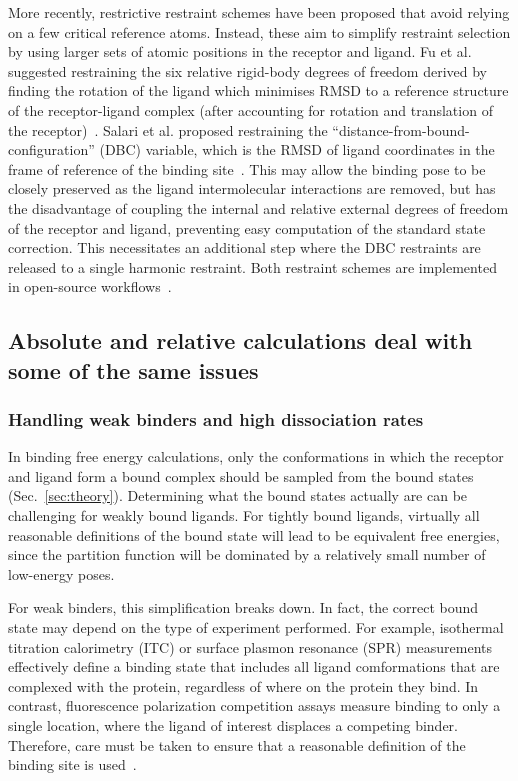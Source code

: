 \documentclass[9pt,bestpractices,pubversion]{livecoms}
\begin{document}
More recently, restrictive restraint schemes have been proposed that avoid relying on a few critical reference atoms. Instead, these aim to simplify restraint selection by using larger sets of atomic positions in the receptor and ligand. Fu et al. suggested restraining the six relative rigid-body degrees of freedom derived by finding the rotation of the ligand which minimises RMSD to a reference structure of the receptor-ligand complex (after accounting for rotation and translation of the receptor)~\cite{fu2017new}. Salari et al. proposed restraining the ``distance-from-bound-configuration'' (DBC) variable, which is the RMSD of ligand coordinates in the frame of reference of the binding site~\cite{salari2018streamlined, ebrahimi2022symmetry}. This may allow the binding pose to be closely preserved as the ligand intermolecular interactions are removed, but has the disadvantage of coupling the internal and relative external degrees of freedom of the receptor and ligand, preventing easy computation of the standard state correction. This necessitates an additional step where the DBC restraints are released to a single harmonic restraint. Both restraint schemes are implemented in open-source workflows~\cite{fu2021bfee2, fu2022accurate, santiago-mcrae2023computing}.

\subsection{Absolute and relative calculations deal with some of the same issues}
\subsubsection{Handling weak binders and high dissociation rates}\label{sec:weak-binders}
In binding free energy calculations, only the conformations in which the receptor and ligand form a bound complex should be sampled from the bound states (Sec.~\ref{sec:theory}). Determining what the bound states actually are can be challenging for weakly bound ligands. For tightly bound ligands, virtually all reasonable definitions of the bound state will lead to be equivalent free energies, since the partition function will be dominated by a relatively small number of low-energy poses. 

For weak binders, this simplification breaks down.  In fact, the correct bound state may depend on the type of experiment performed.  For example, isothermal titration calorimetry (ITC) or surface plasmon resonance (SPR) measurements effectively define a binding state that includes all ligand comformations that are complexed with the protein, regardless of where on the protein they bind. In contrast, fluorescence polarization competition assays measure binding to only a single location, where the ligand of interest displaces a competing binder. Therefore, care must be taken to ensure that a reasonable definition of the binding site is used~\cite{wang2013identifying}.
\end{document}
